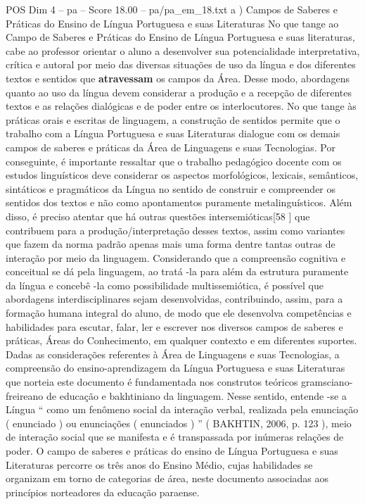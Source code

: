 \begin{textsample}{POS Dim 4 – pa – Score 18.00 – pa/pa\_em\_18.txt}  \label{ex:f4_pos_003}
a ) Campos de Saberes e Práticas do Ensino de Língua Portuguesa e suas Literaturas No que tange ao Campo de Saberes e Práticas do Ensino de Língua Portuguesa e suas literaturas, cabe ao professor orientar o aluno a desenvolver sua potencialidade interpretativa, crítica e autoral por meio das diversas situações de uso da língua e dos diferentes textos e sentidos que \textbf{atravessam} os campos da Área.
Desse modo, abordagens quanto ao uso da língua devem considerar a produção e a recepção de diferentes textos e as relações dialógicas e de poder entre os interlocutores.
No que tange às práticas orais e escritas de linguagem, a construção de sentidos permite que o trabalho com a Língua Portuguesa e suas Literaturas dialogue com os demais campos de saberes e práticas da Área de Linguagens e suas Tecnologias.
Por conseguinte, é importante ressaltar que o trabalho pedagógico docente com os estudos linguísticos deve considerar os aspectos morfológicos, lexicais, semânticos, sintáticos e pragmáticos da Língua no sentido de construir e compreender os sentidos dos textos e não como apontamentos puramente metalinguísticos.
Além disso, é preciso atentar que há outras questões intersemióticas[58 ] que contribuem para a produção/interpretação desses textos, assim como variantes que fazem da norma padrão apenas mais uma forma dentre tantas outras de interação por meio da linguagem.
Considerando que a compreensão cognitiva e conceitual se dá pela linguagem, ao tratá -la para além da estrutura puramente da língua e concebê -la como possibilidade multissemiótica, é possível que abordagens interdisciplinares sejam desenvolvidas, contribuindo, assim, para a formação humana integral do aluno, de modo que ele desenvolva competências e habilidades para escutar, falar, ler e escrever nos diversos campos de saberes e práticas, Áreas do Conhecimento, em qualquer contexto e em diferentes suportes.
Dadas as considerações referentes à Área de Linguagens e suas Tecnologias, a compreensão do ensino-aprendizagem da Língua Portuguesa e suas Literaturas que norteia este documento é fundamentada nos construtos teóricos gramsciano-freireano de educação e bakhtiniano da linguagem.
Nesse sentido, entende -se a Língua “ como um fenômeno social da interação verbal, realizada pela enunciação ( enunciado ) ou enunciações ( enunciados ) ” ( BAKHTIN, 2006, p. 123 ), meio de interação social que se manifesta e é transpassada por inúmeras relações de poder.
O campo de saberes e práticas do ensino de Língua Portuguesa e suas Literaturas percorre os três anos do Ensino Médio, cujas habilidades se organizam em torno de categorias de área, neste documento associadas aos princípios norteadores da educação paraense.

\end{textsample}
